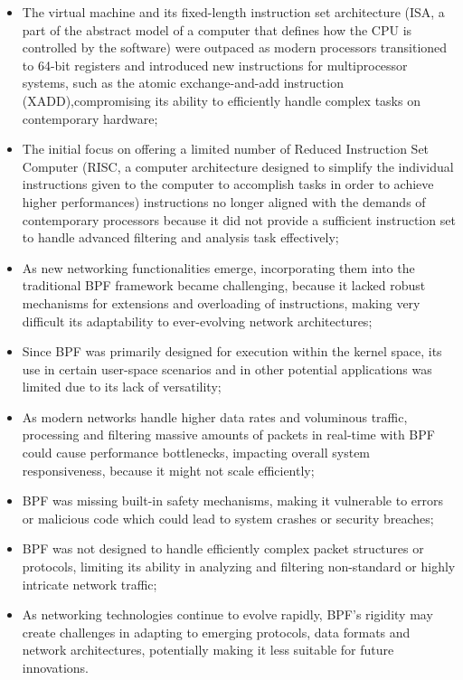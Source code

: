 \begin{itemize}
	\item 
		The virtual machine and its fixed-length instruction set architecture (ISA, a part of the abstract model of a computer that defines how the CPU is controlled by the software) were outpaced as modern processors transitioned to 64-bit registers and introduced new instructions for multiprocessor systems, such as the atomic exchange-and-add instruction (XADD),compromising its ability to efficiently handle complex tasks on contemporary hardware;
	\item 
		The initial focus on offering a limited number of Reduced Instruction Set Computer (RISC, a computer architecture designed to simplify the individual instructions given to the computer to accomplish tasks in order to achieve higher performances) instructions no longer aligned with the demands of contemporary processors because it did not provide a sufficient instruction set to handle advanced filtering and analysis task effectively;
	\item 
		As new networking functionalities emerge, incorporating them into the traditional BPF framework became challenging, because it lacked robust mechanisms for extensions and overloading of instructions, making very difficult its adaptability to ever-evolving network architectures;
	\item 
		Since BPF was primarily designed for execution within the kernel space, its use in certain user-space scenarios and in other potential applications was limited due to its lack of versatility;
	\item 
		As modern networks handle higher data rates and voluminous traffic, processing and filtering massive amounts of packets in real-time with BPF could cause performance bottlenecks, impacting overall system responsiveness, because it might not scale efficiently;
	\item 
		BPF was missing built-in safety mechanisms, making it vulnerable to errors or malicious code which could lead to system crashes or security breaches;
	\item 
		BPF was not designed to handle efficiently complex packet structures or protocols, limiting its ability in analyzing and filtering non-standard or highly intricate network traffic;
	\item 
		As networking technologies continue to evolve rapidly, BPF's rigidity may create challenges in adapting to emerging protocols, data formats and network architectures, potentially making it less suitable for future innovations.
\end{itemize} 

